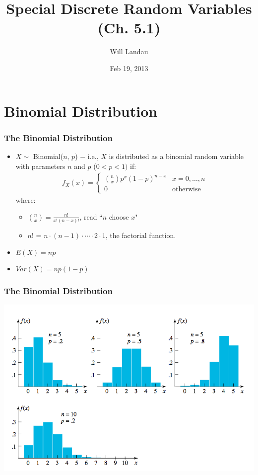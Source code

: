 \documentclass[handout]{beamer}\usepackage{graphicx, color}
\title{Special Discrete Random Variables (Ch. 5.1)}
\author{Will Landau}
\date{Feb 19, 2013}
\institute{Iowa State University}
\numberwithin{equation}{section}
\begin{document}
\begin{frame}
\titlepage
 \end{frame}
 

\section{Binomial Distribution}


\begin{frame}
\frametitle{The Binomial Distribution}
\begin{itemize}
\pause \item $X \sim$ Binomial($n$, $p$) $-$ i.e., $X$ is distributed as a binomial random variable with parameters $n$ and $p$ ($0 < p < 1)$ if:
\pause \begin{align*}
f_X(x) = 
\begin{cases}
\binom{n}{x} p^x (1-p)^{n-x} & x = 0, \ldots, n\\
0 & \text{otherwise} 
\end{cases}
\end{align*}
where: 
\begin{itemize}
\pause \item $\binom{n}{x} = \frac{n!}{x!(n-x)!}$, read ``$n$ choose $x$"
\pause \item $n!$ = $n \cdot (n-1) \cdot \cdots \cdot 2 \cdot 1$, the factorial function.
\end{itemize}
\pause \item $E(X) = np$
\pause \item $Var(X) = np(1-p)$
\end{itemize}
\end{frame}

\begin{frame}
\frametitle{The Binomial Distribution}
 \includegraphics{../../fig/binombar.png}
\end{frame}
\end{document}

